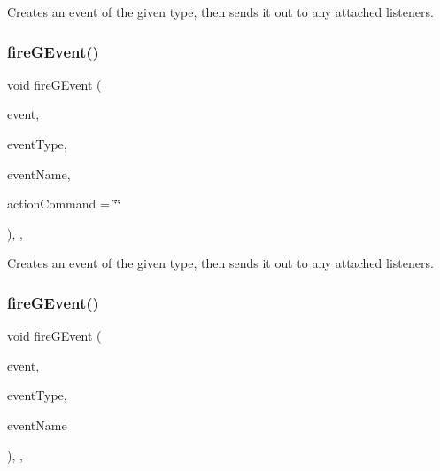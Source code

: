 Creates an event of the given type, then sends it out to any attached listeners. 

\mbox{\label{classGObservable_a119318675d2165bdf7dd853aaf881d4b}} 
\subsubsection{\texorpdfstring{fire\+G\+Event()}{fireGEvent()}\hspace{0.1cm}{\footnotesize\ttfamily [4/8]}}
{\footnotesize\ttfamily void fire\+G\+Event (\begin{DoxyParamCaption}\item[{Q\+Mouse\+Event $\ast$}]{event,  }\item[{Event\+Type}]{event\+Type,  }\item[{const std\+::string \&}]{event\+Name,  }\item[{const std\+::string \&}]{action\+Command = {\ttfamily \char`\"{}\char`\"{}} }\end{DoxyParamCaption})\hspace{0.3cm}{\ttfamily [protected]}, {\ttfamily [virtual]}, {\ttfamily [inherited]}}



Creates an event of the given type, then sends it out to any attached listeners. 

\mbox{\label{classGObservable_a63fd9034e1e1633c1c38eb342bfd34e9}} 
\subsubsection{\texorpdfstring{fire\+G\+Event()}{fireGEvent()}\hspace{0.1cm}{\footnotesize\ttfamily [5/8]}}
{\footnotesize\ttfamily void fire\+G\+Event (\begin{DoxyParamCaption}\item[{Q\+Resize\+Event $\ast$}]{event,  }\item[{Event\+Type}]{event\+Type,  }\item[{const std\+::string \&}]{event\+Name }\end{DoxyParamCaption})\hspace{0.3cm}{\ttfamily [protected]}, {\ttfamily [virtual]}, {\ttfamily [inherited]}}



